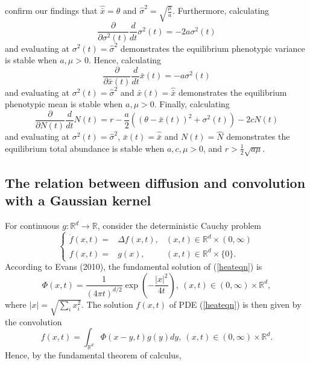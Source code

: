 \documentclass[]{article}
\begin{document}
confirm our findings that \(\hat{\bar x}=\theta\) and
\(\hat\sigma^2=\sqrt{\frac{\mu}{a}}\). Furthermore, calculating
\begin{equation}
\frac{\partial}{\partial\sigma^2(t)}\frac{d}{dt}\sigma^2(t)=-2a\sigma^2(t)
\end{equation} and evaluating at \(\sigma^2(t)=\hat\sigma^2\)
demonstrates the equilibrium phenotypic variance is stable when
\(a,\mu>0\). Hence, calculating \begin{equation}
\frac{\partial}{\partial\bar x(t)}\frac{d}{dt}\bar x(t)=-a\sigma^2(t)
\end{equation} and evaluating at \(\sigma^2(t)=\hat\sigma^2\) and
\(\bar x(t)=\hat{\bar x}\) demonstrates the equilibrium phenotypic mean
is stable when \(a,\mu>0\). Finally, calculating \begin{equation}
\frac{\partial}{\partial N(t)}\frac{d}{dt}N(t)=r-\frac{a}{2}((\theta-\bar x(t))^2+\sigma^2(t))-2cN(t)
\end{equation} and evaluating at \(\sigma^2(t)=\hat\sigma^2\),
\(\bar x(t)=\hat{\bar x}\) and \(N(t)=\hat N\) demonstrates the
equilibrium total abundance is stable when \(a,c,\mu>0\), and
\(r>\frac{1}{2}\sqrt{a\mu}\).

\hypertarget{the-relation-between-diffusion-and-convolution-with-a-gaussian-kernel}{%
\subsection{\texorpdfstring{The relation between diffusion and
convolution with a Gaussian kernel
\label{diffconvequiv}}{The relation between diffusion and convolution with a Gaussian kernel }}\label{the-relation-between-diffusion-and-convolution-with-a-gaussian-kernel}}

For continuous \(g:\mathbb{R}^d\to\mathbb{R}\), consider the
deterministic Cauchy problem \begin{equation}\label{heateqn}
\left\{\begin{matrix}
\dot f(x,t)=&\Delta f(x,t), & (x,t)\in\mathbb{R}^d\times(0,\infty)\\
f(x,t)=&g(x), & (x,t)\in\mathbb{R}^d\times\{0\}.
\end{matrix}\right.
\end{equation} According to Evans (2010), the fundamental solution of
(\ref{heateqn}) is \begin{equation}
\Phi(x,t)=\frac{1}{(4\pi t)^{d/2}}\exp\left(-\frac{|x|^2}{4t}\right), \ (x,t)\in(0,\infty)\times\mathbb{R}^d,
\end{equation} where \(|x|=\sqrt{\sum_ix_i^2}\). The solution \(f(x,t)\)
of PDE (\ref{heateqn}) is then given by the convolution \begin{equation}
f(x,t)=\int_{\mathbb{R}^d}\Phi(x-y,t)g(y)dy, \ (x,t)\in(0,\infty)\times\mathbb{R}^d.
\end{equation} Hence, by the fundamental theorem of calculus,
\end{document}
